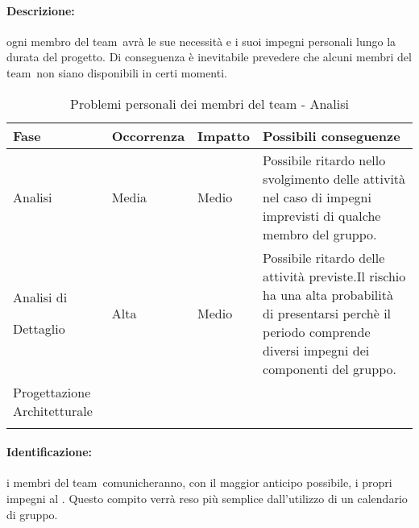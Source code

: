 \documentclass[../PianoProgetto.tex]{subfiles}
\begin{document}
	\paragraph*{Descrizione:} ogni membro del team\g\ avrà le sue necessità e i suoi impegni personali lungo la durata del progetto. Di conseguenza è inevitabile prevedere che alcuni membri del team\g\ non siano disponibili in certi momenti.
	 
	
	\begin{table}[h]
		\centering
		\begin{tabularx}{\textwidth}{F O O P}
			\toprule
			\textbf{Fase} & \textbf{Occorrenza} & \textbf{Impatto} & \textbf{Possibili conseguenze}\\
			\midrule
			Analisi & Media & Medio & Possibile ritardo nello svolgimento delle attività nel caso di impegni imprevisti di qualche membro del gruppo. \\
			\midrule
			Analisi di \par Dettaglio & Alta & Medio & Possibile ritardo delle attività previste.Il rischio ha una alta probabilità di presentarsi perchè il periodo comprende diversi impegni dei componenti del gruppo.\\
			\midrule
			Progettazione Architetturale & & & \\
			\bottomrule
		\end{tabularx}
		\caption{Problemi personali dei membri del team - Analisi}
		\label{tab:Problemi personali dei membri del team - Analisi}	
	\end{table}
		
	\paragraph*{Identificazione:} i membri del team\g\ comunicheranno, con il maggior anticipo possibile, i propri impegni al \responsabilediprogetto . Questo compito verrà reso più semplice dall'utilizzo di un calendario di gruppo. 
	
\end{document}
